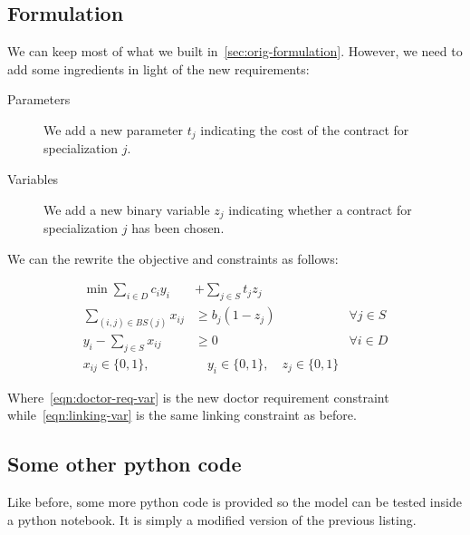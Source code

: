 \documentclass[a4paper,11pt]{article}
\begin{document}
\subsection{Formulation}

We can keep most of what we built in~\ref{sec:orig-formulation}. However, we
need to add some ingredients in light of the new requirements:

\begin{description}
  \item[Parameters] We add a new parameter $t_j$ indicating the cost of the
    contract for specialization $j$.
  \item[Variables] We add a new binary variable $z_j$ indicating whether a
    contract for specialization $j$ has been chosen.
\end{description}

We can the rewrite the objective and constraints as follows:

\begin{align}
  \min \sum_{i\in D} c_i y_i & + \sum_{j\in S} t_j z_j  \\
  \sum_{(i,j) \in \textit{BS}(j)} x_{ij} & \geq b_j (1 - z_j) & \forall j \in S \label{eqn:doctor-req-var} \\
  y_i - \sum_{j\in S} x_{ij} & \geq 0 & \forall i \in D \label{eqn:linking-var} \\
  x_{ij} \in \{0,1\}, &\quad y_i \in \{0,1\}, \quad z_j \in \{0,1\}
\end{align}

Where~\eqref{eqn:doctor-req-var} is the new doctor requirement constraint
while~\eqref{eqn:linking-var} is the same linking constraint as before.

\subsection{Some other python code}

Like before, some more python code is provided so the model can be tested inside
a python notebook. It is simply a modified version of the previous listing.
\end{document}
